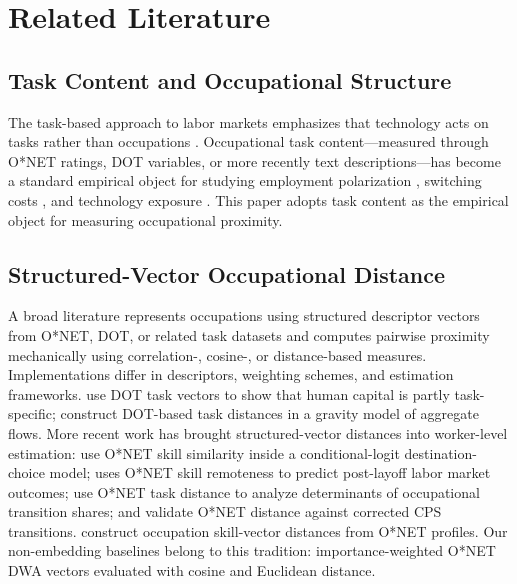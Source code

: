 \documentclass[12pt]{article}
\begin{document}
\section{Related Literature}
\label{sec:literature}


\subsection{Task Content and Occupational Structure}

The task-based approach to labor markets emphasizes that technology acts on tasks rather than occupations \citep{AutorLevyMurnane2003,AcemogluAutor2011}. Occupational task content---measured through O*NET ratings, DOT variables, or more recently text descriptions---has become a standard empirical object for studying employment polarization \citep{AutorDorn2013}, switching costs \citep{GathmannSchonberg2010}, and technology exposure \citep{Webb2020,FeltenRajSeamans2021}. This paper adopts task content as the empirical object for measuring occupational proximity.


\subsection{Structured-Vector Occupational Distance}

A broad literature represents occupations using structured descriptor vectors from O*NET, DOT, or related task datasets and computes pairwise proximity mechanically using correlation-, cosine-, or distance-based measures. Implementations differ in descriptors, weighting schemes, and estimation frameworks. \citet{GathmannSchonberg2010} use DOT task vectors to show that human capital is partly task-specific; \citet{CortesGallipoli2018} construct DOT-based task distances in a gravity model of aggregate flows. More recent work has brought structured-vector distances into worker-level estimation: \citet{MouwEtAl2024} use O*NET skill similarity inside a conditional-logit destination-choice model; \citet{Macaluso2025} uses O*NET skill remoteness to predict post-layoff labor market outcomes; \citet{SchuStanTaska2024} use O*NET task distance to analyze determinants of occupational transition shares; and \citet{CarrilloTudelaEtAl2025} validate O*NET distance against corrected CPS transitions. \citet{KudlyakWolcott2019} construct occupation skill-vector distances from O*NET profiles. Our non-embedding baselines belong to this tradition: importance-weighted O*NET DWA vectors evaluated with cosine and Euclidean distance.
\end{document}
